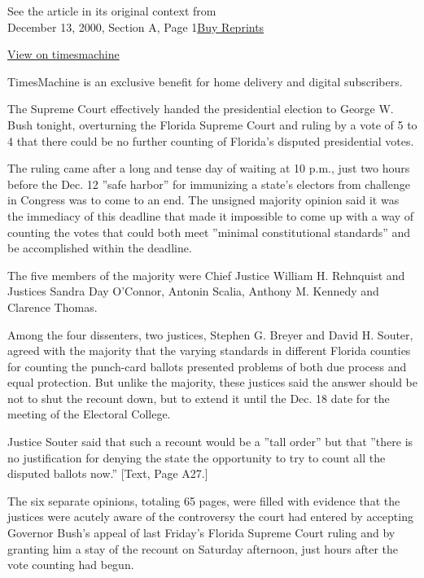 See the article in its original context from\\
December 13, 2000, Section A, Page
1\href{https://store.nytimes.com/collections/new-york-times-page-reprints?utm_source=nytimes\&utm_medium=article-page\&utm_campaign=reprints}{Buy
Reprints}

\href{http://timesmachine.nytimes.com/timesmachine/2000/12/13/667188.html}{View
on timesmachine}

TimesMachine is an exclusive benefit for home delivery and digital
subscribers.

The Supreme Court effectively handed the presidential election to George
W. Bush tonight, overturning the Florida Supreme Court and ruling by a
vote of 5 to 4 that there could be no further counting of Florida's
disputed presidential votes.

The ruling came after a long and tense day of waiting at 10 p.m., just
two hours before the Dec. 12 ''safe harbor'' for immunizing a state's
electors from challenge in Congress was to come to an end. The unsigned
majority opinion said it was the immediacy of this deadline that made it
impossible to come up with a way of counting the votes that could both
meet ''minimal constitutional standards'' and be accomplished within the
deadline.

The five members of the majority were Chief Justice William H. Rehnquist
and Justices Sandra Day O'Connor, Antonin Scalia, Anthony M. Kennedy and
Clarence Thomas.

Among the four dissenters, two justices, Stephen G. Breyer and David H.
Souter, agreed with the majority that the varying standards in different
Florida counties for counting the punch-card ballots presented problems
of both due process and equal protection. But unlike the majority, these
justices said the answer should be not to shut the recount down, but to
extend it until the Dec. 18 date for the meeting of the Electoral
College.

Justice Souter said that such a recount would be a ''tall order'' but
that ''there is no justification for denying the state the opportunity
to try to count all the disputed ballots now.'' {[}Text, Page A27.{]}

The six separate opinions, totaling 65 pages, were filled with evidence
that the justices were acutely aware of the controversy the court had
entered by accepting Governor Bush's appeal of last Friday's Florida
Supreme Court ruling and by granting him a stay of the recount on
Saturday afternoon, just hours after the vote counting had begun.

